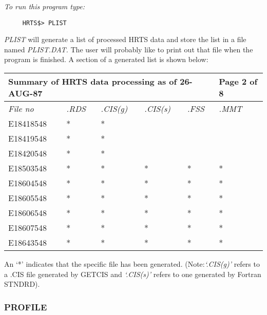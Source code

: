 {\em To run this program type:}
\begin{verbatim}                
     HRTS$> PLIST                        
\end{verbatim}
{\em PLIST} will generate a list of processed HRTS data and store the list
   in a file named {\em PLIST.DAT.}  The user will probably like to print out
   that file when the program is finished.  A section of a generated list
   is shown below:
\begin{center}
\begin{tabular}{||l l l l l l||}
\hline
\multicolumn{5}{||l}{\bf Summary of HRTS data processing as of 26-AUG-87}  &
\multicolumn{1}{l||}{\bf Page 2 of 8} \\ 
\hline                                                                    
{\em File no} & {\em .RDS} & {\em .CIS(g)} & {\em .CIS(s)} & {\em .FSS} & {\em 
.MMT} \\  
      E18418548    &     *    &     *   &        &           &              \\
      E18419548    &     *    &     *   &        &           &              \\
      E18420548    &     *    &     *   &        &           &              \\
      E18503548    &     *    &     *   &      * &         * &         *    \\
      E18604548    &     *    &     *   &      * &         * &         *    \\
      E18605548    &     *    &     *   &      * &         * &         *    \\
      E18606548    &     *    &     *   &      * &         * &         *    \\
      E18607548    &     *    &     *   &      * &         * &         *    \\
      E18643548    &     *    &     *   &      * &         * &         *    \\
\hline                
\end{tabular}
\end{center}
  An `*' indicates that the specific file has been generated.
 (Note:{\em `.CIS(g)'} refers to a .CIS file generated by GETCIS and
{\em `.CIS(s)'} refers to one generated by Fortran STNDRD).

\subsubsection{PROFILE}             

